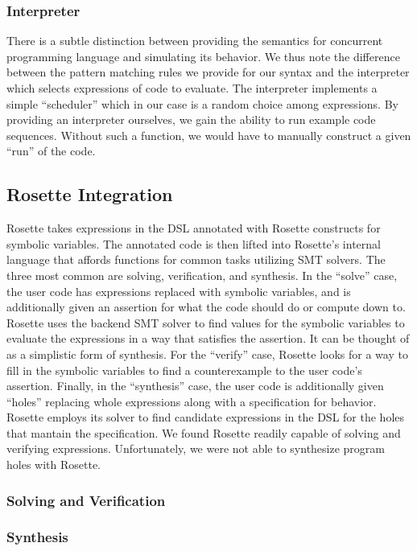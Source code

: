 \subsubsection{Interpreter}
There is a subtle distinction between providing the semantics for concurrent programming language and simulating its behavior.  We thus note the difference between the pattern matching rules we provide for our syntax and the interpreter which selects expressions of code to evaluate.  The interpreter implements a simple ``scheduler'' which in our case is a random choice among expressions.  By providing an interpreter ourselves, we gain the ability to run example code sequences.  Without such a function, we would have to manually construct a given ``run'' of the code.

\subsection{Rosette Integration}
Rosette takes expressions in the DSL annotated with Rosette constructs for symbolic variables.  The annotated code is then lifted into Rosette's internal language that affords functions for common tasks utilizing SMT solvers.  The three most common are solving, verification, and synthesis.  In the ``solve'' case, the user code has expressions replaced with symbolic variables, and is additionally given an assertion for what the code should do or compute down to. Rosette uses the backend SMT solver to find values for the symbolic variables to evaluate the expressions in a way that satisfies the assertion.  It can be thought of as a simplistic form of synthesis.  For the ``verify'' case, Rosette looks for a way to fill in the symbolic variables to find a counterexample to the user code's assertion. Finally, in the ``synthesis'' case, the user code is additionally given ``holes'' replacing whole expressions along with a specification for behavior.  Rosette employs its solver to find candidate expressions in the DSL for the holes that mantain the specification.  We found Rosette readily capable of solving and verifying expressions.  Unfortunately, we were not able to synthesize program holes with Rosette.

\subsubsection{Solving and Verification}

\subsubsection{Synthesis}

